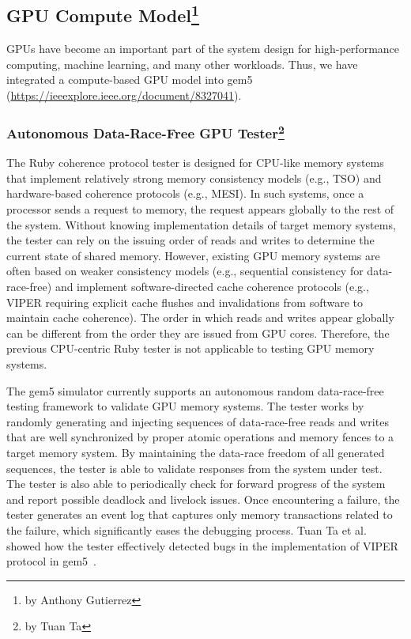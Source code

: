 \subsection[GPU Compute Model]{GPU Compute Model\footnote{by Anthony Gutierrez}}

GPUs have become an important part of the system design for high-performance computing, machine learning, and many other workloads.
Thus, we have integrated a compute-based GPU model into gem5~\cite{gutierrez-hpca-gpu} (\url{https://ieeexplore.ieee.org/document/8327041}).

\subsubsection[Autonomous Data-Race-Free GPU Tester]{Autonomous Data-Race-Free GPU Tester\footnote{by Tuan Ta}}

The Ruby coherence protocol tester is designed for CPU-like memory systems that implement relatively strong memory consistency models (e.g., TSO) and hardware-based coherence protocols (e.g., MESI).
In such systems, once a processor sends a request to memory, the request appears globally to the rest of the system.
Without knowing implementation details of target memory systems, the tester can rely on the issuing order of reads and writes to determine the current state of shared memory.
However, existing GPU memory systems are often based on weaker consistency models (e.g., sequential consistency for data-race-free) and implement software-directed cache coherence protocols (e.g., VIPER requiring explicit cache flushes and invalidations from software to maintain cache coherence).
The order in which reads and writes appear globally can be different from the order they are issued from GPU cores.
Therefore, the previous CPU-centric Ruby tester is not applicable to testing GPU memory systems.

The gem5 simulator currently supports an autonomous random data-race-free testing framework to validate GPU memory systems.
The tester works by randomly generating and injecting sequences of data-race-free reads and writes that are well synchronized by proper atomic operations and memory fences to a target memory system.
By maintaining the data-race freedom of all generated sequences, the tester is able to validate responses from the system under test.
The tester is also able to periodically check for forward progress of the system and report possible deadlock and livelock issues.
Once encountering a failure, the tester generates an event log that captures only memory transactions related to the failure, which significantly eases the debugging process.
Tuan Ta et al. showed how the tester effectively detected bugs in the implementation of VIPER protocol in gem5~\cite{Ta2019gputesting}.
